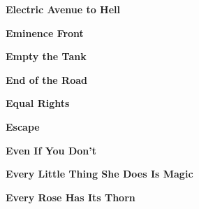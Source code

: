 \vspace{10pt} 
\begin{center}\textbf{Electric Avenue to Hell}\end{center}
\newline
\vspace{10pt} 
\begin{center}\textbf{Eminence Front}\end{center}
\newline
\vspace{10pt} 
\begin{center}\textbf{Empty the Tank}\end{center}
\newline
\vspace{10pt} 
\begin{center}\textbf{End of the Road}\end{center}
\newline
\vspace{10pt} 
\begin{center}\textbf{Equal Rights}\end{center}
\newline
\vspace{10pt} 
\begin{center}\textbf{Escape}\end{center}
\newline
\vspace{10pt} 
\begin{center}\textbf{Even If You Don't}\end{center}
\newline
\vspace{10pt} 
\begin{center}\textbf{Every Little Thing She Does Is Magic}\end{center}
\newline
\vspace{10pt} 
\begin{center}\textbf{Every Rose Has Its Thorn}\end{center}
\newline
\vspace{10pt} 
